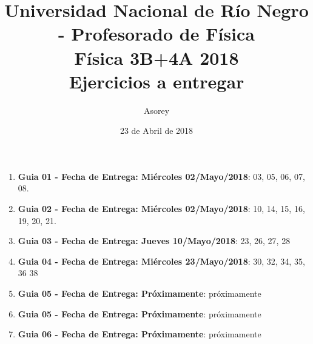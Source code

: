 \documentclass[a4paper,12pt]{article}
\begin{document}
\title{
{\normalsize{Universidad Nacional de Río Negro - Profesorado de Física}}\\
Física 3B+4A  2018 \\ Ejercicios a entregar}
\author{Asorey}
\date{23 de Abril de 2018}
\maketitle

\begin{enumerate}
	\item {\bf{Guia 01 - Fecha de Entrega: Miércoles 02/Mayo/2018}}: 03, 05, 06, 07, 08. 
	\item {\bf{Guia 02 - Fecha de Entrega: Miércoles 02/Mayo/2018}}: 10, 14, 15, 16, 19, 20, 21. 
	\item {\bf{Guia 03 - Fecha de Entrega: Jueves 10/Mayo/2018}}: 23, 26, 27, 28 
	\item {\bf{Guia 04 - Fecha de Entrega: Miércoles 23/Mayo/2018}}: 30, 32, 34, 35, 36 38
	\item {\bf{Guia 05 - Fecha de Entrega: Próximamente}}: próximamente
	\item {\bf{Guia 05 - Fecha de Entrega: Próximamente}}: próximamente
	\item {\bf{Guia 06 - Fecha de Entrega: Próximamente}}: próximamente


\end{enumerate}
\end{document}
